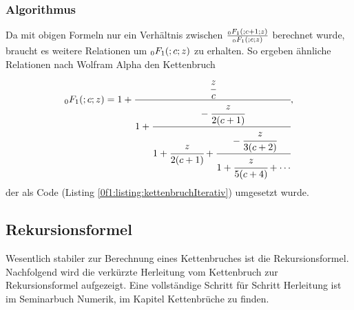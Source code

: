 \subsubsection{Algorithmus}
Da mit obigen Formeln nur ein Verhältnis zwischen $	\frac{\mathstrut_0F_1(;c+1;z)}{\mathstrut_0F_1(;c;z)}$ berechnet wurde, braucht es weitere Relationen um $\mathstrut_0F_1(;c;z)$ zu erhalten.
So ergeben ähnliche Relationen nach Wolfram Alpha \cite{0f1:wolfram-0f1} den Kettenbruch
\begin{equation}
	\label{0f1:math:kettenbruch:0f1:eq}
	\mathstrut_0F_1(;c;z) = 1 + \cfrac{\cfrac{z}{c}}{1+\cfrac{-\cfrac{z}{2(c+1)}}{1+\cfrac{z}{2(c+1)}+\cfrac{-\cfrac{z}{3(c+2)}}{1+\cfrac{z}{5(c+4)} + \cdots}}},
\end{equation}
der als Code (Listing \ref{0f1:listing:kettenbruchIterativ})  umgesetzt wurde. 




\subsection{Rekursionsformel
\label{0f1:subsection:rekursionsformel}}
Wesentlich stabiler zur Berechnung eines Kettenbruches ist die Rekursionsformel. Nachfolgend wird die verkürzte Herleitung vom Kettenbruch zur Rekursionsformel aufgezeigt. Eine vollständige Schritt für Schritt Herleitung ist im Seminarbuch Numerik, im Kapitel Kettenbrüche \cite{0f1:kettenbrueche} zu finden.

